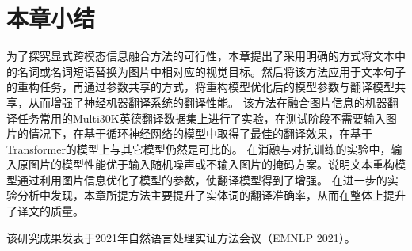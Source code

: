 






\section{本章小结}
为了探究显式跨模态信息融合方法的可行性，本章提出了采用明确的方式将文本中的名词或名词短语替换为图片中相对应的视觉目标。然后将该方法应用于文本句子的重构任务，再通过参数共享的方式，将重构模型优化后的模型参数与翻译模型共享，从而增强了神经机器翻译系统的翻译性能。
该方法在融合图片信息的机器翻译任务常用的Multi30K英德翻译数据集上进行了实验，在测试阶段不需要输入图片的情况下，在基于循环神经网络的模型中取得了最佳的翻译效果，在基于Transformer的模型上与其它模型仍然是可比的。
在消融与对抗训练的实验中，输入原图片的模型性能优于输入随机噪声或不输入图片的掩码方案。说明文本重构模型通过利用图片信息优化了模型的参数，使翻译模型得到了增强。
在进一步的实验分析中发现，本章所提方法主要提升了实体词的翻译准确率，从而在整体上提升了译文的质量。

该研究成果发表于2021年自然语言处理实证方法会议（EMNLP 2021）。

